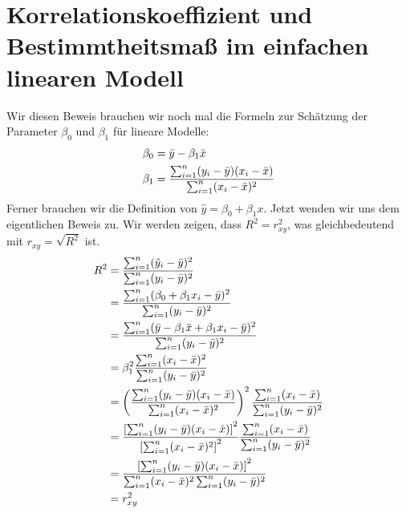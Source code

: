 \documentclass{article}
\begin{document}
	\section{Korrelationskoeffizient und Bestimmtheitsmaß im einfachen linearen Modell}
	Wir diesen Beweis brauchen wir noch mal die Formeln zur Schätzung der Parameter $\beta_0$ und $\beta_1$ für lineare Modelle:
	\begin{align}
		\beta_0 &= \bar{y} - \beta_1\bar{x} \notag \\
		\beta_1 &= \frac{\sum_{i=1}^{n}(y_i-\bar{y})(x_i-\bar{x})}{\sum_{i=1}^n (x_i-\bar{x})^2} \notag
	\end{align}
	Ferner brauchen wir die Definition von $\hat{y}=\beta_0+\beta_1x$. Jetzt wenden wir uns dem eigentlichen Beweis zu. Wir werden zeigen, dass $R^2=r^2_{xy}$, was gleichbedeutend mit $r_{xy}=\sqrt{R^2}$ ist.
	\begin{align}
		R^2 &= \frac{\sum_{i=1}^n (\hat{y}_i-\bar{y})^2}{\sum_{i=1}^n (y_i-\bar{y})^2} \notag \\
		&= \frac{\sum_{i=1}^n (\beta_0+\beta_1x_i - \bar{y})^2}{\sum_{i=1}^n (y_i-\bar{y})^2} \notag \\
		&= \frac{\sum_{i=1}^n (\bar{y}-\beta_1\bar{x}+\beta_1x_i-\bar{y})^2}{\sum_{i=1}^n (y_i-\bar{y})^2} \notag \\
		&= \beta_1^2\frac{\sum_{i=1}^n (x_i-\bar{x})^2}{\sum_{i=1}^n (y_i-\bar{y})^2} \notag \\
		&=\left(\frac{\sum_{i=1}^n (y_i-\bar{y})(x_i-\bar{x})}{\sum_{i=1}^n (x_i-\bar{x})^2}\right)^2\frac{\sum_{i=1}^n (x_i-\bar{x})}{\sum_{i=1}^n (y_i-\bar{y})^2} \notag \\
		&= \frac{\left[\sum_{i=1}^n (y_i-\bar{y})(x_i-\bar{x})\right]^2}{\left[\sum_{i=1}^n (x_i-\bar{x})^2\right]^2}\frac{\sum_{i=1}^n (x_i-\bar{x})}{\sum_{i=1}^n (y_i-\bar{y})^2} \notag \\
		&= \frac{\left[\sum_{i=1}^n (y_i-\bar{y})(x_i-\bar{x})\right]^2}{\sum_{i=1}^n (x_i-\bar{x})^2\sum_{i=1}^n (y_i-\bar{y})^2} \notag \\
		&= r_{xy}^2 \notag
	\end{align}
\end{document}
